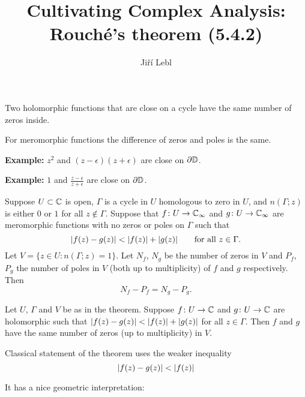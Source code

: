 \documentclass[10pt,aspectratio=169]{beamer}
\author{Ji\v{r}\'i Lebl}
\institute[OSU]{%
Departemento pri Matematiko de Oklahoma {\^S}tata Universitato}
\title{Cultivating Complex Analysis:\\%
Rouch\'e's theorem (5.4.2)}
\date{}
\begin{document}
\begin{frame}
\titlepage
\end{frame}

\begin{frame}
Two holomorphic functions that are close on a cycle
have the same number of zeros inside.

\pause
\bigskip

For meromorphic functions the difference of zeros and poles
is the same.

\pause
\bigskip

\textbf{Example:} $z^2$ and $(z-\epsilon)(z+\epsilon)$ are close on $\partial {\mathbb{D}}$.

\pause
\bigskip

\textbf{Example:} $1$ and $\frac{z-\epsilon}{z+\epsilon}$ are close on $\partial {\mathbb{D}}$.

\end{frame}

\begin{frame}
\begin{theorem}[Rouch\'e]
Suppose $U \subset {\mathbb{C}}$ is open, $\Gamma$ is
a cycle in $U$ homologous to zero in $U$,
and $n(\Gamma;z)$ is either $0$ or $1$ for all $z \notin \Gamma$.
\pause
Suppose that $f \colon U \to {\mathbb{C}}_\infty$ and $g \colon U \to {\mathbb{C}}_\infty$
are meromorphic functions with no zeros or poles on
$\Gamma$ such that
\[
\lvert {f(z)-g(z)} \rvert < \lvert {f(z)} \rvert+\lvert {g(z)} \rvert
\qquad
\text{for all } z \in \Gamma .
\]
\pause
Let $V = \{ z \in U : n(\Gamma;z) = 1 \}$.
Let $N_f$, $N_g$ be the number of zeros in $V$
and $P_f$, $P_g$ the number of poles in $V$ (both up to multiplicity)
of $f$ and $g$ respectively.
\pause
Then
\begin{equation*}
N_f - P_f = 
N_g - P_g.
\end{equation*}
\end{theorem}

\pause

\begin{corollary}[Rouch\'e]
Let $U$, $\Gamma$ and $V$ be as in the theorem.
Suppose $f \colon U \to {\mathbb{C}}$ and $g \colon U \to {\mathbb{C}}$
are holomorphic such that
$\lvert {f(z)-g(z)} \rvert < \lvert {f(z)} \rvert+\lvert {g(z)} \rvert$
for all $z \in \Gamma$.  Then $f$ and $g$ have the same number of zeros (up
to multiplicity) in $V$.
\end{corollary}
\end{frame}

\begin{frame}
Classical statement of the theorem uses the weaker inequality
\[
\lvert {f(z)-g(z)} \rvert < \lvert {f(z)} \rvert
\]

\pause

It has a nice geometric interpretation:

\begin{center}
\end{center}

\end{frame}
\end{document}
